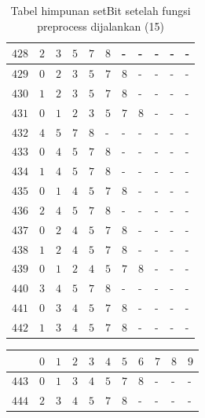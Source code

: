\begin{appendices}
\begin{table}[H]
\begin{tabular} {|l|l|l|l|l|l|l|l|l|l|l|}
  		$ 428 $ & $ 2 $ &$ 3 $ &$ 5 $ &$ 7 $ &$ 8 $ & - &  - &  - &  - &  -   \\ \hline
  		$ 429 $ & $ 0 $ &$ 2 $ &$ 3 $ &$ 5 $ &$ 7 $ &$ 8 $ & - &  - &  - &  -   \\ \hline
  		$ 430 $ & $ 1 $ &$ 2 $ &$ 3 $ &$ 5 $ &$ 7 $ &$ 8 $ & - &  - &  - &  -   \\ \hline
  		$ 431 $ & $ 0 $ &$ 1 $ &$ 2 $ &$ 3 $ &$ 5 $ &$ 7 $ &$ 8 $ & - &  - &  -   \\ \hline
  		$ 432 $ & $ 4 $ &$ 5 $ &$ 7 $ &$ 8 $ & - &  - &  - &  - &  - &  -   \\ \hline
  		$ 433 $ & $ 0 $ &$ 4 $ &$ 5 $ &$ 7 $ &$ 8 $ & - &  - &  - &  - &  -   \\ \hline
  		$ 434 $ & $ 1 $ &$ 4 $ &$ 5 $ &$ 7 $ &$ 8 $ & - &  - &  - &  - &  -   \\ \hline
  		$ 435 $ & $ 0 $ &$ 1 $ &$ 4 $ &$ 5 $ &$ 7 $ &$ 8 $ & - &  - &  - &  -   \\ \hline
  		$ 436 $ & $ 2 $ &$ 4 $ &$ 5 $ &$ 7 $ &$ 8 $ & - &  - &  - &  - &  -   \\ \hline
  		$ 437 $ & $ 0 $ &$ 2 $ &$ 4 $ &$ 5 $ &$ 7 $ &$ 8 $ & - &  - &  - &  -   \\ \hline
  		$ 438 $ & $ 1 $ &$ 2 $ &$ 4 $ &$ 5 $ &$ 7 $ &$ 8 $ & - &  - &  - &  -   \\ \hline
  		$ 439 $ & $ 0 $ &$ 1 $ &$ 2 $ &$ 4 $ &$ 5 $ &$ 7 $ &$ 8 $ & - &  - &  -   \\ \hline
  		$ 440 $ & $ 3 $ &$ 4 $ &$ 5 $ &$ 7 $ &$ 8 $ & - &  - &  - &  - &  -   \\ \hline
  		$ 441 $ & $ 0 $ &$ 3 $ &$ 4 $ &$ 5 $ &$ 7 $ &$ 8 $ & - &  - &  - &  -   \\ \hline
  		$ 442 $ & $ 1 $ &$ 3 $ &$ 4 $ &$ 5 $ &$ 7 $ &$ 8 $ & - &  - &  - &  -   \\ \hline  		
  	\end{tabular}\caption{Tabel himpunan setBit setelah fungsi preprocess dijalankan (15)}
  	\label{tab:setbit_15}
  \end{table}
  \begin{table}[H]
  	\centering
  	\begin{tabular} {|l|l|l|l|l|l|l|l|l|l|l|} \hline
  		\backslashbox{$Num$}{$index$} & $ 0 $ & $ 1 $ & $ 2 $ & $ 3 $ & $ 4 $ & $ 5 $ & $ 6 $ & $ 7 $ & $ 8 $ & $ 9 $ \\ \hline
  		$ 443 $ & $ 0 $ &$ 1 $ &$ 3 $ &$ 4 $ &$ 5 $ &$ 7 $ &$ 8 $ & - &  - &  -   \\ \hline
  		$ 444 $ & $ 2 $ &$ 3 $ &$ 4 $ &$ 5 $ &$ 7 $ &$ 8 $ & - &  - &  - &  -   \\ \hline

\end{tabular}
\end{table}
\end{appendices}
